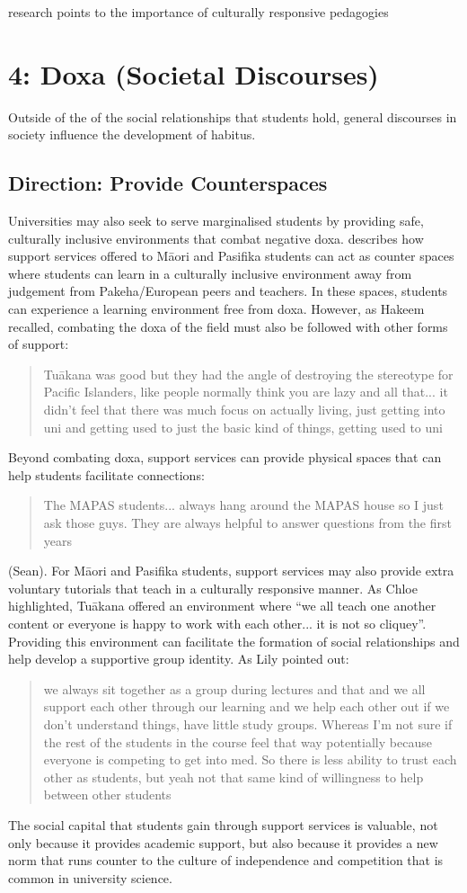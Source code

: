 research points to the importance of culturally responsive pedagogies \citep{glynn2010culturally}


\section{4: Doxa (Societal Discourses)}
Outside of the of the social relationships that students hold, general discourses in society influence the development of habitus.

\subsection{Direction: Provide Counterspaces}


Universities may also seek to serve marginalised students by providing safe, culturally inclusive environments that combat negative doxa. \cite{mayeda2014you} describes how support services offered to M\={a}ori and Pasifika students can act as counter spaces where students can learn in a culturally inclusive environment away from judgement from Pakeha/European peers and teachers. In these spaces, students can experience a learning environment free from doxa. However, as Hakeem recalled, combating the doxa of the field must also be followed with other forms of support: \blockquote{Tu\={a}kana was good but they had the angle of destroying the stereotype for Pacific Islanders, like people normally think you are lazy and all that... it didn't feel that there was much focus on actually living, just getting into uni and getting used to just the basic kind of things, getting used to uni} Beyond combating doxa, support services can provide physical spaces that can help students facilitate connections: \blockquote{The MAPAS students... always hang around the MAPAS house so I just ask those guys. They are always helpful to answer questions from the first years} (Sean). For M\={a}ori and Pasifika students, support services may also provide extra voluntary tutorials that teach in a culturally responsive manner. As Chloe highlighted, Tu\={a}kana offered an environment where ``we all teach one another content or everyone is happy to work with each other...  it is not so cliquey''. Providing this environment can facilitate the formation of social relationships and help develop a supportive group identity. As Lily pointed out: \blockquote{we always sit together as a group during lectures and that and we all support each other through our learning and we help each other out if we don’t understand things, have little study groups. Whereas I’m not sure if the rest of the students in the course feel that way potentially because everyone is competing to get into med. So there is less ability to trust each other as students, but yeah not that same kind of willingness to help between other students}. The social capital that students gain through support services is valuable, not only because it provides academic support, but also because it provides a new norm that runs counter to the culture of independence and competition that is common in university science.

